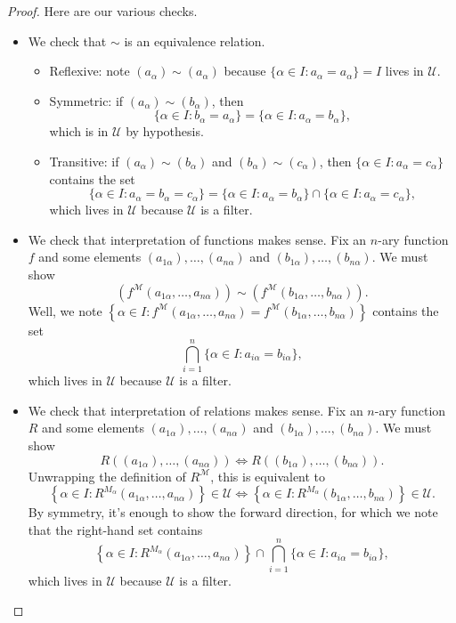 \documentclass[../notes.tex]{subfiles}
\begin{document}
\begin{proof}
	Here are our various checks.
	\begin{itemize}
		\item We check that $\sim$ is an equivalence relation.
		\begin{itemize}
			\item Reflexive: note $(a_\alpha)\sim(a_\alpha)$ because $\{\alpha\in I:a_\alpha=a_\alpha\}=I$ lives in $\mathcal U$.
			\item Symmetric: if $(a_\alpha)\sim(b_\alpha)$, then
			\[\{\alpha\in I:b_\alpha=a_\alpha\}=\{\alpha\in I:a_\alpha=b_\alpha\},\]
			which is in $\mathcal U$ by hypothesis.
			\item Transitive: if $(a_\alpha)\sim(b_\alpha)$ and $(b_\alpha)\sim(c_\alpha)$, then $\{\alpha\in I:a_\alpha=c_\alpha\}$ contains the set
			\[\{\alpha\in I:a_\alpha=b_\alpha=c_\alpha\}=\{\alpha\in I:a_\alpha=b_\alpha\}\cap\{\alpha\in I:a_\alpha=c_\alpha\},\]
			which lives in $\mathcal U$ because $\mathcal U$ is a filter.
		\end{itemize}
		\item We check that interpretation of functions makes sense. Fix an $n$-ary function $f$ and some elements $(a_{1\alpha}),\ldots,(a_{n\alpha})$ and $(b_{1\alpha}),\ldots,(b_{n\alpha})$. We must show
		\[\left(f^\mathcal M(a_{1\alpha},\ldots,a_{n\alpha})\right)\sim\left(f^\mathcal M(b_{1\alpha},\ldots,b_{n\alpha})\right).\]
		Well, we note $\left\{\alpha\in I:f^\mathcal M(a_{1\alpha},\ldots,a_{n\alpha})=f^\mathcal M(b_{1\alpha},\ldots,b_{n\alpha})\right\}$ contains the set
		\[\bigcap_{i=1}^n\{\alpha\in I:a_{i\alpha}=b_{i\alpha}\},\]
		which lives in $\mathcal U$ because $\mathcal U$ is a filter.
		\item We check that interpretation of relations makes sense. Fix an $n$-ary function $R$ and some elements $(a_{1\alpha}),\ldots,(a_{n\alpha})$ and $(b_{1\alpha}),\ldots,(b_{n\alpha})$. We must show
		\[R((a_{1\alpha}),\ldots,(a_{n\alpha}))\iff R((b_{1\alpha}),\ldots,(b_{n\alpha})).\]
		Unwrapping the definition of $R^\mathcal M$, this is equivalent to
		\[\left\{\alpha\in I:R^{M_\alpha}(a_{1\alpha},\ldots,a_{n\alpha})\right\}\in\mathcal U\iff\left\{\alpha\in I:R^{M_\alpha}(b_{1\alpha},\ldots,b_{n\alpha})\right\}\in\mathcal U.\]
		By symmetry, it's enough to show the forward direction, for which we note that the right-hand set contains
		\[\left\{\alpha\in I:R^{M_\alpha}(a_{1\alpha},\ldots,a_{n\alpha})\right\}\cap\bigcap_{i=1}^n\{\alpha\in I:a_{i\alpha}=b_{i\alpha}\},\]
		which lives in $\mathcal U$ because $\mathcal U$ is a filter.
		\qedhere
	\end{itemize}
\end{proof}
\end{document}
